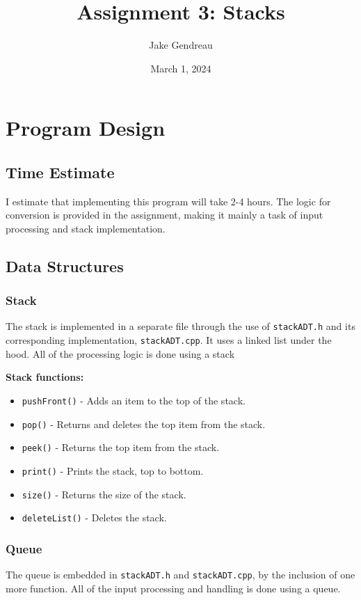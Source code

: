 \documentclass{article}
\title{Assignment 3: Stacks}
\author{Jake Gendreau}
\date{March 1, 2024}
\begin{document}
\maketitle

\tableofcontents

\newpage

\section{Program Design}
    \subsection{Time Estimate}
    I estimate that implementing this program will take 2-4 hours. The logic for conversion is provided in the assignment, making it mainly a task of input processing and stack implementation.
    
    \subsection{Data Structures}
        \subsubsection{Stack}
        The stack is implemented in a separate file through the use of \texttt{stackADT.h} and its corresponding implementation, \texttt{stackADT.cpp}. It uses a linked list under the hood. All of the processing logic is done using a stack
    
        \textbf{Stack functions:}
        \begin{itemize}
            \item \texttt{pushFront()} - Adds an item to the top of the stack.
            \item \texttt{pop()} - Returns and deletes the top item from the stack.
            \item \texttt{peek()} - Returns the top item from the stack.
            \item \texttt{print()} - Prints the stack, top to bottom.
            \item \texttt{size()} - Returns the size of the stack.
            \item \texttt{deleteList()} - Deletes the stack.
        \end{itemize}
    
        \subsubsection{Queue}
        The queue is embedded in \texttt{stackADT.h} and \texttt{stackADT.cpp}, by the inclusion of one more function. All of the input processing and handling is done using a queue.
        
\end{document}
